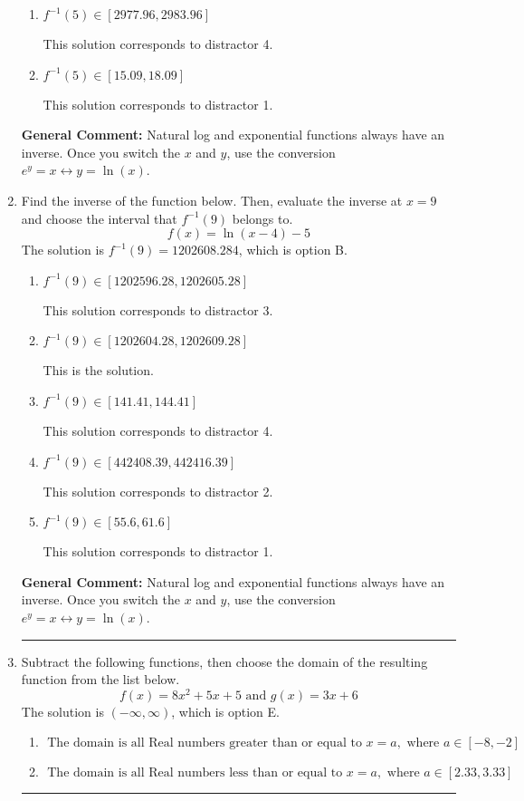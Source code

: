 \documentclass{extbook}[14pt]
\newcommand{\litem}[1]{\item #1

\rule{\textwidth}{0.4pt}}
\begin{document}
\begin{enumerate}
{\begin{enumerate}[label=\Alph*.]
 This solution corresponds to distractor 3.
\item \( f^{-1}(5) \in [2977.96, 2983.96] \)

 This solution corresponds to distractor 4.
\item \( f^{-1}(5) \in [15.09, 18.09] \)

 This solution corresponds to distractor 1.
\end{enumerate}

\textbf{General Comment:} Natural log and exponential functions always have an inverse. Once you switch the $x$ and $y$, use the conversion $ e^y = x \leftrightarrow y=\ln(x)$.
}
\litem{
Find the inverse of the function below. Then, evaluate the inverse at $x = 9$ and choose the interval that $f^{-1}(9)$ belongs to.
\[ f(x) = \ln{(x-4)}-5 \]The solution is \( f^{-1}(9) = 1202608.284 \), which is option B.\begin{enumerate}[label=\Alph*.]
\item \( f^{-1}(9) \in [1202596.28, 1202605.28] \)

 This solution corresponds to distractor 3.
\item \( f^{-1}(9) \in [1202604.28, 1202609.28] \)

 This is the solution.
\item \( f^{-1}(9) \in [141.41, 144.41] \)

 This solution corresponds to distractor 4.
\item \( f^{-1}(9) \in [442408.39, 442416.39] \)

 This solution corresponds to distractor 2.
\item \( f^{-1}(9) \in [55.6, 61.6] \)

 This solution corresponds to distractor 1.
\end{enumerate}

\textbf{General Comment:} Natural log and exponential functions always have an inverse. Once you switch the $x$ and $y$, use the conversion $ e^y = x \leftrightarrow y=\ln(x)$.
}
\litem{
Subtract the following functions, then choose the domain of the resulting function from the list below.
\[ f(x) = 8x^{2} +5 x + 5 \text{ and } g(x) = 3x + 6 \]The solution is \( (-\infty, \infty) \), which is option E.\begin{enumerate}[label=\Alph*.]
\item \( \text{ The domain is all Real numbers greater than or equal to } x = a, \text{ where } a \in [-8, -2] \)


\item \( \text{ The domain is all Real numbers less than or equal to } x = a, \text{ where } a \in [2.33, 3.33] \)



\end{enumerate}}
\end{enumerate}
\end{document}
